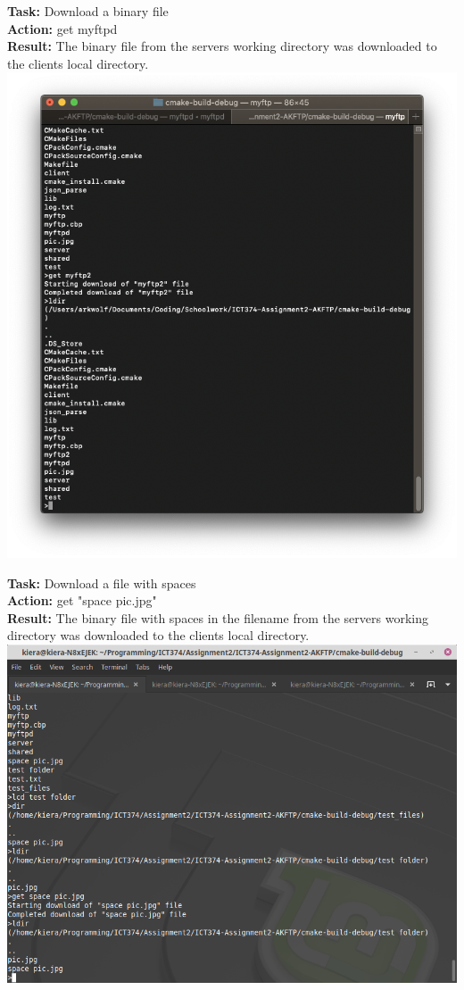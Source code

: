 \documentclass{article}
\begin{document}
\textbf{Task:} Download a binary file\\
\textbf{Action:} get myftpd\\
\textbf{Result:} The binary file from the servers working directory was downloaded to the clients local directory.\\
\includegraphics[width=\textwidth]{testpictures/getbinary}

\textbf{Task:} Download a file with spaces\\
\textbf{Action:} get "space pic.jpg"\\
\textbf{Result:} The binary file with spaces in the filename from the servers working directory was downloaded to the clients local directory.\\
\includegraphics[width=\textwidth]{testpictures/space_get}
\end{document}
